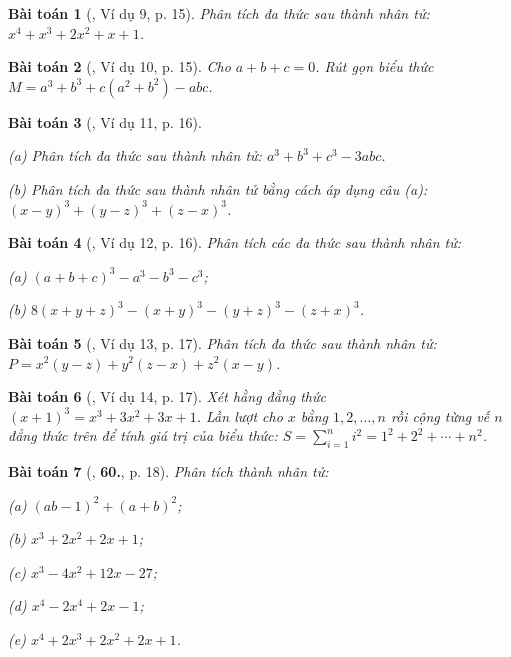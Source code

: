 \documentclass{article}
\numberwithin{equation}{section}
\newtheorem{baitoan}{Bài toán}[section]
\begin{document}
\begin{baitoan}[\cite{Binh_Toan_8_tap_1}, Ví dụ 9, p. 15]
	Phân tích đa thức sau thành nhân tử: 	$x^4 + x^3 + 2x^2 + x + 1$.
\end{baitoan}

\begin{baitoan}[\cite{Binh_Toan_8_tap_1}, Ví dụ 10, p. 15]
	Cho $a + b + c = 0$. Rút gọn biểu thức $M = a^3 + b^3 + c(a^2 + b^2) - abc$.
\end{baitoan}

\begin{baitoan}[\cite{Binh_Toan_8_tap_1}, Ví dụ 11, p. 16]
	\begin{enumerate*}
		\item[(a)] Phân tích đa thức sau thành nhân tử: $a^3 + b^3 + c^3 - 3abc$.
		\item[(b)] Phân tích đa thức sau thành nhân tử bằng cách áp dụng câu (a): $(x - y)^3 + (y - z)^3 + (z - x)^3$.
	\end{enumerate*}
\end{baitoan}

\begin{baitoan}[\cite{Binh_Toan_8_tap_1}, Ví dụ 12, p. 16]
	Phân tích các đa thức sau thành nhân tử:
	\begin{enumerate*}
		\item[(a)] $(a + b + c)^3 - a^3 - b^3 - c^3$;
		\item[(b)] $8(x + y + z)^3 - (x + y)^3 - (y + z)^3 - (z + x)^3$.
	\end{enumerate*}
\end{baitoan}

\begin{baitoan}[\cite{Binh_Toan_8_tap_1}, Ví dụ 13, p. 17]
	Phân tích đa thức sau thành nhân tử: $P = x^2(y - z) + y^2(z - x) + z^2(x -y)$.
\end{baitoan}

\begin{baitoan}[\cite{Binh_Toan_8_tap_1}, Ví dụ 14, p. 17]
	Xét hằng đẳng thức $(x + 1)^3 = x^3 + 3x^2 + 3x + 1$. Lần lượt cho $x$ bằng $1,2,\ldots,n$ rồi cộng từng vế $n$ đẳng thức trên để tính giá trị của biểu thức: $S = \sum_{i=1}^n i^2 = 1^2 + 2^2 + \cdots + n^2$.
\end{baitoan}

\begin{baitoan}[\cite{Binh_Toan_8_tap_1}, \textbf{60.}, p. 18]
	Phân tích thành nhân tử:
	\begin{enumerate*}
		\item[(a)] $(ab - 1)^2 + (a + b)^2$;
		\item[(b)] $x^3 + 2x^2 + 2x + 1$;
		\item[(c)] $x^3 - 4x^2 + 12x - 27$;
		\item[(d)] $x^4 - 2x^4 + 2x - 1$;
		\item[(e)] $x^4 + 2x^3 + 2x^2 + 2x + 1$.
	\end{enumerate*}
\end{baitoan}
\end{document}
